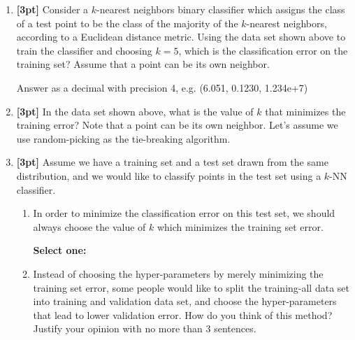 \begin{enumerate}
    \item \textbf{[3pt]} Consider a $k$-nearest neighbors binary classifier which assigns the class of a test point to be the class of the majority of the $k$-nearest neighbors, according to a Euclidean distance metric. Using the data set shown above to train the classifier and choosing $k=5$, which is the classification error on the training set? Assume that a point can be its own neighbor.
    
    Answer as a decimal with precision 4, e.g. (6.051, 0.1230, 1.234e+7)
    
    \begin{tcolorbox}[fit,height=1cm, width=4cm, blank, borderline={1pt}{-2pt},nobeforeafter]
    \end{tcolorbox}
 
    
    
    \item \textbf{[3pt]} In the data set shown above, what is the value of $k$ that minimizes the training error? Note that a point can be its own neighbor. Let’s assume we use random-picking as the tie-breaking algorithm.
    
    \begin{tcolorbox}[fit,height=1cm, width=4cm, blank, borderline={1pt}{-2pt},nobeforeafter]
    \end{tcolorbox}

    
    
    \item \textbf{[3pt]} Assume we have a training set and a test set drawn from the same distribution, and we would like to classify points in the test set using a $k$-NN classifier. 
    
    \begin{enumerate}
        \item In order to minimize the classification error on this test set, we should always choose the value of $k$ which minimizes the training set error. 
    
    \textbf{Select one:}
    
    \item Instead of choosing the hyper-parameters by merely minimizing the training set error, some people would like to split the training-all data set into training and validation data set, and choose the hyper-parameters that lead to lower validation error. How do you think of this method? Justify your opinion with no more than 3 sentences.


\end{enumerate}
\end{enumerate}
